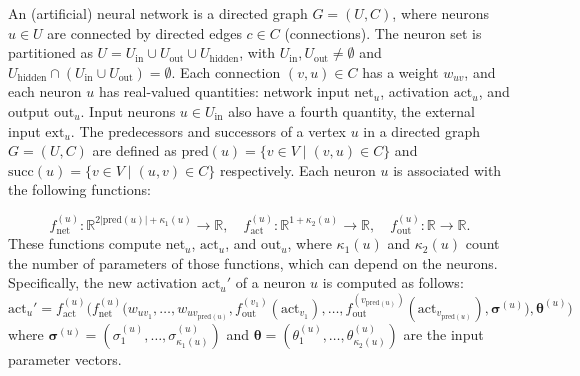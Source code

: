 
\begin{definition}
\label{NeuralNetwork}
An (artificial) neural network is a directed graph \( G = (U, C) \), where neurons \( u \in U \) 
are connected by directed edges \( c \in C \) (connections). 
The neuron set is partitioned as \( U = U_{\mathrm{in}} \cup U_{\mathrm{out}} \cup U_{\mathrm{hidden}} \), 
with \( U_{\mathrm{in}}, U_{\mathrm{out}} \neq \emptyset \) and \( U_{\mathrm{hidden}} \cap (U_{\mathrm{in}} 
\cup U_{\mathrm{out}}) = \emptyset \). Each connection \( (v, u) \in C \) has a weight \( w_{uv} \), and each neuron \( u \) 
has real-valued quantities: network input \( \mathrm{net}_u \), activation \( \mathrm{act}_u \), and output \( \mathrm{out}_u \).
 Input neurons \( u \in U_{\mathrm{in}} \) also have a fourth quantity, the external input \( \mathrm{ext}_u \). 
 The predecessors and successors of a vertex \( u \) in a directed graph \( G = (U, C) \) are defined as
$\mathrm{pred}(u) = \{ v \in V \mid (v, u) \in C \}$ and 
$\mathrm{succ}(u) = \{ v \in V \mid (u, v) \in C \}$ respectively. Each neuron \( u \) 
is associated with the following functions:  

$$f_{\mathrm{net}}^{(u)} : \mathbb{R}^{2|\mathrm{pred}(u)|+ \kappa_1 (u)} \to \mathbb{R}, \quad
 f_{\mathrm{act}}^{(u)} : \mathbb{R}^{1+\kappa_2 (u)} \to \mathbb{R}, \quad f_{\mathrm{out}}^{(u)} : \mathbb{R} \to \mathbb{R}. $$
 These functions compute \( \mathrm{net}_u \), \( \mathrm{act}_u \), and \( \mathrm{out}_u \), 
 where \( \kappa_1(u) \) and \( \kappa_2(u) \) count the number of parameters of those functions, 
 which can depend on the neurons. Specifically, the new activation $\mathrm{act}_u'$ of a neuron $u$ is computed as follows:
\begin{equation*}
\mathrm{act}_u'=  
f_{\mathrm{act}}^{(u)} \big(f_{\mathrm{net}}^{(u)} \big(
w_{uv_1}, \ldots, w_{uv_{\mathrm{pred}(u)}}, f_{\mathrm{out}}^{(v_1)}(\mathrm{act}_{v_1}),\ldots,
f_{\mathrm{out}}^{(v_{\mathrm{pred}(u)})}(\mathrm{act}_{v_{\mathrm{pred}(u)}}),
\boldsymbol{\sigma}^{(u)}\big), \boldsymbol{\theta}^{(u)}\big)
\end{equation*}
where $\boldsymbol{\sigma}^{(u)} = (\sigma_1^{(u)} , \ldots , 
\sigma_{\kappa_1(u)}^{(u)} )$ and $\boldsymbol{\theta} = (\theta_1^{(u)} , \ldots , \theta_{\kappa_2(u)}^{(u)} )$ are the input parameter vectors.
\leanok
\end{definition}